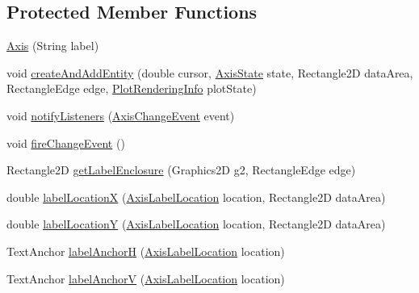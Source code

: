 \subsection*{Protected Member Functions}
\begin{DoxyCompactItemize}
\item 
\mbox{\hyperlink{classorg_1_1jfree_1_1chart_1_1axis_1_1_axis_ad6d2fd5fd4c7643e102148374dda78c1}{Axis}} (String label)
\item 
void \mbox{\hyperlink{classorg_1_1jfree_1_1chart_1_1axis_1_1_axis_a6c61fba1bc787b780a44bc2bdd90a7f9}{create\+And\+Add\+Entity}} (double cursor, \mbox{\hyperlink{classorg_1_1jfree_1_1chart_1_1axis_1_1_axis_state}{Axis\+State}} state, Rectangle2D data\+Area, Rectangle\+Edge edge, \mbox{\hyperlink{classorg_1_1jfree_1_1chart_1_1plot_1_1_plot_rendering_info}{Plot\+Rendering\+Info}} plot\+State)
\item 
void \mbox{\hyperlink{classorg_1_1jfree_1_1chart_1_1axis_1_1_axis_a74182ff777426a13310a385ac99460bc}{notify\+Listeners}} (\mbox{\hyperlink{classorg_1_1jfree_1_1chart_1_1event_1_1_axis_change_event}{Axis\+Change\+Event}} event)
\item 
void \mbox{\hyperlink{classorg_1_1jfree_1_1chart_1_1axis_1_1_axis_a6beeee0f30137736d5234cb1db19f0a7}{fire\+Change\+Event}} ()
\item 
Rectangle2D \mbox{\hyperlink{classorg_1_1jfree_1_1chart_1_1axis_1_1_axis_a2c1b6ffdcab95dd0f36cd1d2f195b1bc}{get\+Label\+Enclosure}} (Graphics2D g2, Rectangle\+Edge edge)
\item 
double \mbox{\hyperlink{classorg_1_1jfree_1_1chart_1_1axis_1_1_axis_a782bb1fd0455477d582252857ca969a7}{label\+LocationX}} (\mbox{\hyperlink{classorg_1_1jfree_1_1chart_1_1axis_1_1_axis_label_location}{Axis\+Label\+Location}} location, Rectangle2D data\+Area)
\item 
double \mbox{\hyperlink{classorg_1_1jfree_1_1chart_1_1axis_1_1_axis_a6c75a7f0200f8c5b1f0ab07bb8cbd943}{label\+LocationY}} (\mbox{\hyperlink{classorg_1_1jfree_1_1chart_1_1axis_1_1_axis_label_location}{Axis\+Label\+Location}} location, Rectangle2D data\+Area)
\item 
Text\+Anchor \mbox{\hyperlink{classorg_1_1jfree_1_1chart_1_1axis_1_1_axis_ae8b4ab3f80703d05433657810338ea50}{label\+AnchorH}} (\mbox{\hyperlink{classorg_1_1jfree_1_1chart_1_1axis_1_1_axis_label_location}{Axis\+Label\+Location}} location)
\item 
Text\+Anchor \mbox{\hyperlink{classorg_1_1jfree_1_1chart_1_1axis_1_1_axis_aa493df3b8a59065a2216c3e2d517ee05}{label\+AnchorV}} (\mbox{\hyperlink{classorg_1_1jfree_1_1chart_1_1axis_1_1_axis_label_location}{Axis\+Label\+Location}} location)

\end{DoxyCompactItemize}
